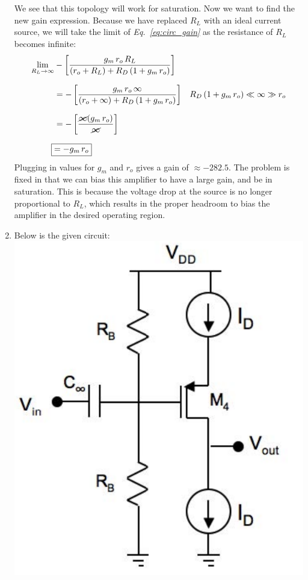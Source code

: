 \documentclass[12pt, fleqn]{article}
\begin{document}
\begin{enumerate}[label=(\alph*)]
    We see that this topology will work for saturation.  Now we want to find the new gain expression.  Because we have replaced $R_L$ with an ideal current source, we will take the limit of \textit{Eq.~\ref{eq:circ_gain}} as the resistance of $R_L$ becomes infinite:
    \begin{align*}
        \lim_{R_L\to\infty} &-\left[\frac{g_m\,r_o\,R_L}{\left(r_o + R_L\right)+ R_D \left(1 + g_m\,r_o\right)}\right]\\[0.25cm]
        &= -\left[\frac{g_m\,r_o\,\infty}{\left(r_o + \infty\right)+ R_D \left(1 + g_m\,r_o\right)}\right]
        &\textit{$R_D \left(1 + g_m\,r_o\right) \ll \infty \gg r_o$}\\[0.25cm]
        &= -\left[\frac{\cancel{\infty}(g_m\,r_o)}{\cancel{\infty}}\right]\\[0.25cm]
        \Aboxed{&= -g_m\,r_o}
    \end{align*}
    Plugging in values for $g_m$ and $r_o$ gives a gain of $\boxed{\approx -282.5}$.  The problem is fixed in that we can bias this amplifier to have a large gain, and be in saturation.  This is because the voltage drop at the source is no longer proportional to $R_L$, which results in the proper headroom to bias the amplifier in the desired operating region. 
    \newpage\noindent
    \item
    {
    Below is the given circuit:\\
    \includegraphics[scale=0.35, center]{p1c.png}\\
}
\end{enumerate}
\end{document}
